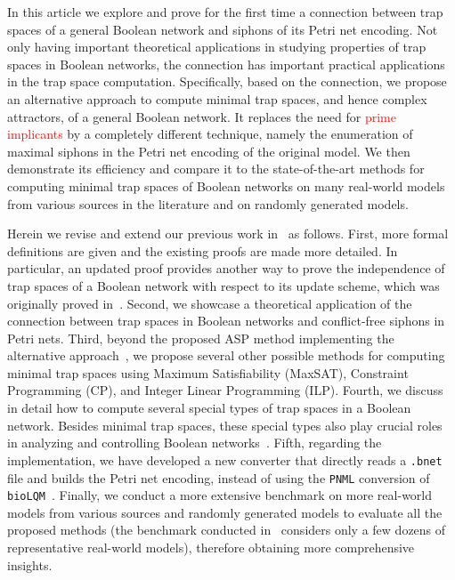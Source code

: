 \documentclass[preprint,12pt]{elsarticle}
\newcommand{\change}[1]{\textcolor{red}{#1}}
\begin{document}
In this article we explore and prove for the first time a connection between trap spaces of a general Boolean network and siphons of its Petri net encoding.
Not only having important theoretical applications in studying properties of trap spaces in Boolean networks, the connection has important practical applications in the trap space computation.
Specifically, based on the connection, we propose an alternative approach to compute minimal trap spaces, and hence complex attractors, of a general Boolean network.
It replaces the need for \change{prime implicants} by a completely different technique, namely the enumeration of maximal siphons in the Petri net encoding of the original model.
We then demonstrate its efficiency and compare it to the state-of-the-art methods for computing minimal trap spaces of Boolean networks on many real-world models from various sources in the literature and on randomly generated models.

Herein we revise and extend our previous work in~\cite{DBLP:conf/cmsb/TrinhBHS22} as follows.
First, more formal definitions are given and the existing proofs are made more detailed.
In particular, an updated proof provides another way to prove the independence of trap spaces of a Boolean network with respect to its update scheme, which was originally proved in~\cite{klarner2015computing}.
Second, we showcase a theoretical application of the connection between trap spaces in Boolean networks and conflict-free siphons in Petri nets.
Third, beyond the proposed ASP method implementing the alternative approach~\cite{DBLP:conf/cmsb/TrinhBHS22}, we propose several other possible methods for computing minimal trap spaces using Maximum Satisfiability (MaxSAT), Constraint Programming (CP), and Integer Linear Programming (ILP).
Fourth, we discuss in detail how to compute several special types of trap spaces in a Boolean network.
Besides minimal trap spaces, these special types also play crucial roles in analyzing and controlling Boolean networks~\cite{Rozum2021}.
Fifth, regarding the implementation, we have developed a new converter that directly reads a \texttt{.bnet} file and builds the Petri net encoding, instead of using the \texttt{PNML} conversion of \texttt{bioLQM}~\cite{DBLP:conf/cmsb/TrinhBHS22}.
Finally, we conduct a more extensive benchmark on more real-world models from various sources and randomly generated models to evaluate all the proposed methods (the benchmark conducted in~\cite{DBLP:conf/cmsb/TrinhBHS22} considers only a few dozens of representative real-world models), therefore obtaining more comprehensive insights.
\end{document}
